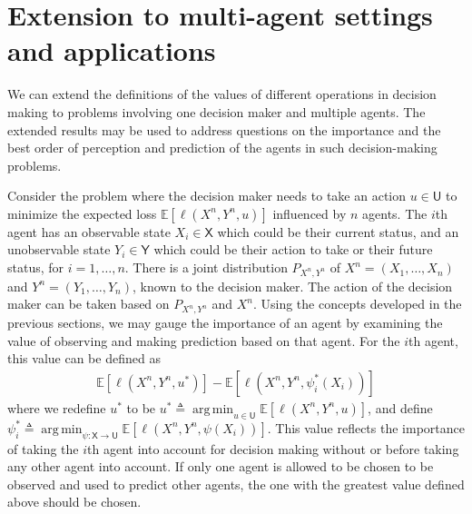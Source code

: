 \documentclass{article}
\newcommand{\E}{\mathbb{E}}
\DeclareMathOperator*{\argmin}{arg\,min}
\def\sU{{\mathsf U}}
\def\sX{{\mathsf X}}
\def\sY{{\mathsf Y}}
\def\deq{\triangleq}
\begin{document}
\section{Extension to multi-agent settings and applications}
We can extend the definitions of the values of different operations in decision making to problems involving one decision maker and multiple agents. The extended results may be used to address questions on the importance and the best order of perception and prediction of the agents in such decision-making problems.

Consider the problem where the decision maker needs to take an action $u\in\sU$ to minimize the expected loss $\E[\ell(X^n, Y^n, u)]$ influenced by $n$ agents. The $i$th agent has an observable state $X_i\in\sX$ which could be their current status, and an unobservable state $Y_i\in\sY$ which could be their action to take or their future status, for $i=1,\ldots,n$. There is a joint distribution $P_{X^n,Y^n}$ of $X^n = (X_1,\ldots,X_n)$ and $Y^n = (Y_1,\ldots, Y_n)$, known to the decision maker. The action of the decision maker can be taken based on $P_{X^n,Y^n}$ and $X^n$.
Using the concepts developed in the previous sections, we may gauge the importance of an agent by examining the value of observing and making prediction based on that agent. For the $i$th agent, this value can be defined as
\begin{align}
\E[\ell(X^n, Y^n, u^*)] - \E[\ell(X^n, Y^n, \psi_i^*(X_i))]
\end{align}
where we redefine $u^*$ to be 
$
u^* \deq \argmin_{u\in\sU} \E[\ell(X^n, Y^n, u)] 
$,
and define 
$
\psi_i^* \deq \argmin_{\psi:\sX\rightarrow\sU}\E[\ell(X^n, Y^n, \psi(X_i))] 
$.
This value reflects the importance of taking the $i$th agent into account for decision making without or before taking any other agent into account. If only one agent is allowed to be chosen to be observed and used to predict other agents, the one with the greatest value defined above should be chosen.



\end{document}
